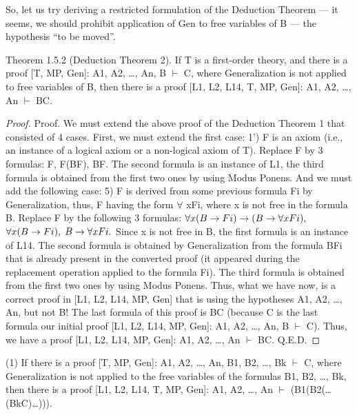 So, let us try deriving a restricted formulation of the Deduction Theorem --- it seems, we should prohibit
application of Gen to free variables of B --- the hypothesis ``to be moved''.

\begin{theorem}
Theorem 1.5.2 (Deduction Theorem 2). If T is a first-order theory, and there is a proof [T, MP, Gen]: A1, A2, \ldots , An, B \(\vdash\) C, where Generalization is not applied to free variables of B, then there is a proof [L1, L2, L14, T, MP, Gen]: A1, A2, \ldots , An \(\vdash\) B\IMPLIES C.
\end{theorem}

\begin{proof}
Proof. We must extend the above proof of the Deduction Theorem 1 that consisted of 4 cases. First, we
must extend the first case:
1') F is an axiom (i.e., an instance of a logical axiom or a non-logical axiom of T). Replace F by 3
formulas: F, F\IMPLIES (B\IMPLIES F), B\IMPLIES F. The second formula is an instance of L1, the third formula is obtained
from the first two ones by using Modus Ponens.
And we must add the following case:
5) F is derived from some previous formula Fi by Generalization, thus, F having the form \(\forall\) xFi, where x
is not free in the formula B. Replace F by the following 3 formulas:
\(\forall x(B\rightarrow Fi)\rightarrow (B\rightarrow \forall xFi),\)
\(\forall x(B\rightarrow Fi),\)
\(B\rightarrow \forall xFi.\)
Since x is not free in B, the first formula is an instance of L14. The second formula is obtained by
Generalization from the formula B\IMPLIES Fi that is already present in the converted proof (it appeared during
the replacement operation applied to the formula Fi). The third formula is obtained from the first two ones
by using Modus Ponens.
Thus, what we have now, is a correct proof in [L1, L2, L14, MP, Gen] that is using the hypotheses A1,
A2, \ldots , An, but not B! The last formula of this proof is B\IMPLIES C (because C is the last formula our initial
proof [L1, L2, L14, MP, Gen]: A1, A2, \ldots , An, B \(\vdash\) C). Thus, we have a proof [L1, L2, L14, MP, Gen]: A1,
A2, \ldots , An \(\vdash\) B\IMPLIES C. Q.E.D.
\end{proof}

\begin{corollary}

(1) If there is a proof [T, MP, Gen]: A1, A2, \ldots , An, B1, B2, \ldots , Bk \(\vdash\) C, where
Generalization is not applied to the free variables of the formulas B1, B2, \ldots , Bk, then there is a proof [L1,
L2, L14, T, MP, Gen]: A1, A2, \ldots , An \(\vdash\) (B1\IMPLIES (B2\IMPLIES (\ldots \IMPLIES (Bk\IMPLIES C)\ldots ))).
\end{corollary}

